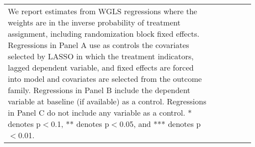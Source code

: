 \begin{table}[H]
\begin{tabular}{@{\extracolsep{0pt}}lccccc}
{{We report estimates from WGLS regressions where the weights are in the inverse probability of treatment 
assignment, including randomization block fixed effects. 
Regressions in Panel A use as controls the covariates selected by LASSO in which the treatment indicators,
lagged dependent variable, and fixed effects are forced into model and covariates are selected from the outcome family.
Regressions in Panel B include the dependent variable at baseline (if available) as a control. 
Regressions in Panel C do not include any variable as a control. 
* denotes p$<$0.1, ** denotes p$<$0.05, and *** denotes p$<$0.01.}} \\\end{tabular} \end{table} 